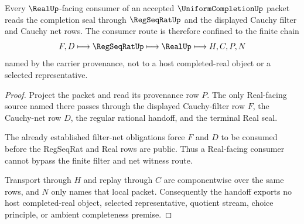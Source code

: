\begin{theorem}
\label{thm:uniform-completion-real-regseqrat-handoff}
Every $\RealUp$-facing consumer of an accepted $\UniformCompletionUp$ packet reads the completion seal through $\RegSeqRatUp$ and the displayed Cauchy filter and Cauchy net rows. The consumer route is therefore confined to the finite chain
$$
F,D \longmapsto \RegSeqRatUp \longmapsto \RealUp \longmapsto H,C,P,N
$$
named by the carrier provenance, not to a host completed-real object or a selected representative.
\end{theorem}
\begin{proof}
Project the packet and read its provenance row $P$. The only Real-facing source named there passes through the displayed Cauchy-filter row $F$, the Cauchy-net row $D$, the regular rational handoff, and the terminal Real seal.

The already established filter-net obligations force $F$ and $D$ to be consumed before the RegSeqRat and Real rows are public. Thus a Real-facing consumer cannot bypass the finite filter and net witness route.

Transport through $H$ and replay through $C$ are componentwise over the same rows, and $N$ only names that local packet. Consequently the handoff exports no host completed-real object, selected representative, quotient stream, choice principle, or ambient completeness premise.
\end{proof}

